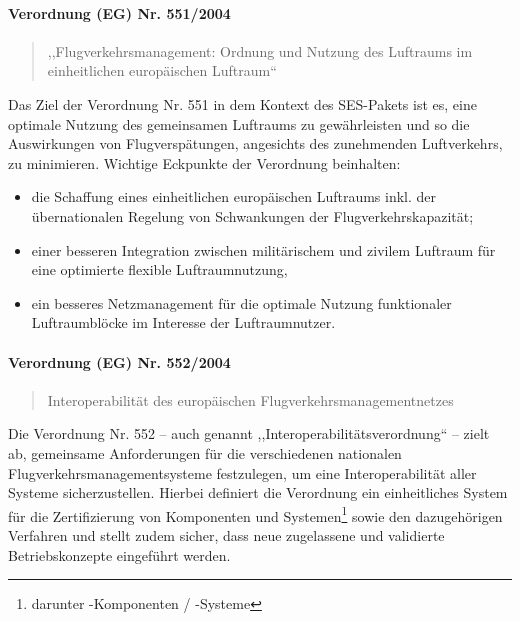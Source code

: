 \paragraph{Verordnung (EG) Nr. 551/2004} \label{er_551}
\begin{quote}
    ,,Flugverkehrsmanagement: Ordnung und Nutzung des Luftraums im einheitlichen europäischen Luftraum``
    \cite{2004R0551, 2004R0551_summary}
\end{quote}
Das Ziel der Verordnung Nr. 551 in dem Kontext des SES-Pakets ist es, eine optimale Nutzung des gemeinsamen Luftraums zu gewährleisten und so die Auswirkungen von Flugverspätungen, angesichts des zunehmenden Luftverkehrs, zu minimieren. 
Wichtige Eckpunkte der Verordnung beinhalten: 
    \begin{itemize}
        \item die Schaffung eines einheitlichen europäischen Luftraums inkl. der übernationalen Regelung von Schwankungen der Flugverkehrskapazität;
        \item  einer besseren Integration zwischen militärischem und zivilem Luftraum für eine optimierte flexible Luftraumnutzung,
        \item ein besseres Netzmanagement für die optimale Nutzung funktionaler Luftraumblöcke im Interesse der Luftraumnutzer. \cite{2004R0551_summary}
    \end{itemize}


\paragraph{Verordnung (EG) Nr. 552/2004} \label{er_552}

\begin{quote}
    Interoperabilität des europäischen Flugverkehrsmanagement\-netzes
    \cite{2004R0552, 2004R0552_summary}
\end{quote}
Die Verordnung Nr. 552 -- auch genannt ,,Interoperabilitätsverordnung`` -- zielt ab, gemeinsame Anforderungen für die verschiedenen nationalen Flugverkehrsmanagementsysteme festzulegen, um eine Interoperabilität aller Systeme sicherzustellen. \cite{2004R0552_summary}
Hierbei definiert die Verordnung ein einheitliches System für die Zertifizierung von Komponenten und Systemen\footnote{darunter \atmans-Komponenten / -Systeme} sowie den dazugehörigen Verfahren und stellt zudem sicher, dass neue zugelassene und validierte Betriebskonzepte eingeführt werden. \cite[Art. 3 Abs. 1]{2004R0552}


